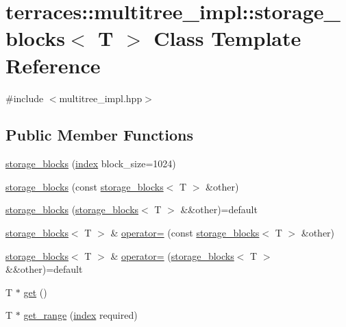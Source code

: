 \hypertarget{classterraces_1_1multitree__impl_1_1storage__blocks}{}\section{terraces\+:\+:multitree\+\_\+impl\+:\+:storage\+\_\+blocks$<$ T $>$ Class Template Reference}
\label{classterraces_1_1multitree__impl_1_1storage__blocks}


{\ttfamily \#include $<$multitree\+\_\+impl.\+hpp$>$}

\subsection*{Public Member Functions}
\begin{DoxyCompactItemize}
\item 
\hyperlink{classterraces_1_1multitree__impl_1_1storage__blocks_addbab5fd5bbfd28586b02b27eb496609}{storage\+\_\+blocks} (\hyperlink{namespaceterraces_adbc33ccb543d1634e96d0eb02e472c77}{index} block\+\_\+size=1024)
\item 
\hyperlink{classterraces_1_1multitree__impl_1_1storage__blocks_a1789287b99036f79ba623fb3e7e73b58}{storage\+\_\+blocks} (const \hyperlink{classterraces_1_1multitree__impl_1_1storage__blocks}{storage\+\_\+blocks}$<$ T $>$ \&other)
\item 
\hyperlink{classterraces_1_1multitree__impl_1_1storage__blocks_af4305d0aea87f46cbea75eb2994e2001}{storage\+\_\+blocks} (\hyperlink{classterraces_1_1multitree__impl_1_1storage__blocks}{storage\+\_\+blocks}$<$ T $>$ \&\&other)=default
\item 
\hyperlink{classterraces_1_1multitree__impl_1_1storage__blocks}{storage\+\_\+blocks}$<$ T $>$ \& \hyperlink{classterraces_1_1multitree__impl_1_1storage__blocks_a8bbf444efc64e3b58d59c54e88efdc0e}{operator=} (const \hyperlink{classterraces_1_1multitree__impl_1_1storage__blocks}{storage\+\_\+blocks}$<$ T $>$ \&other)
\item 
\hyperlink{classterraces_1_1multitree__impl_1_1storage__blocks}{storage\+\_\+blocks}$<$ T $>$ \& \hyperlink{classterraces_1_1multitree__impl_1_1storage__blocks_a4383b9fbd6c066f8df3f9b892a4e464e}{operator=} (\hyperlink{classterraces_1_1multitree__impl_1_1storage__blocks}{storage\+\_\+blocks}$<$ T $>$ \&\&other)=default
\item 
T $\ast$ \hyperlink{classterraces_1_1multitree__impl_1_1storage__blocks_a803e0b2bf8f057b661847ba9caedec41}{get} ()
\item 
T $\ast$ \hyperlink{classterraces_1_1multitree__impl_1_1storage__blocks_a3d970b6bbbf72c574f600c976a54b879}{get\+\_\+range} (\hyperlink{namespaceterraces_adbc33ccb543d1634e96d0eb02e472c77}{index} required)
\end{DoxyCompactItemize}


